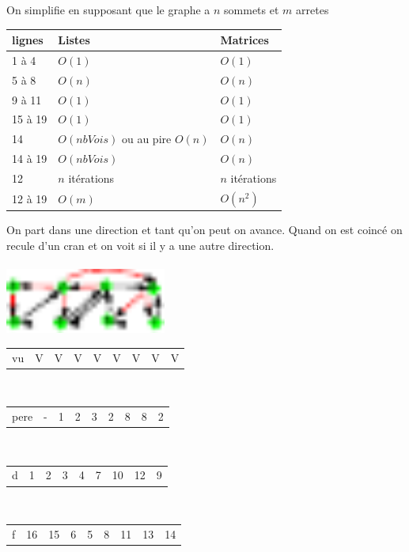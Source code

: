  On simplifie en supposant que le graphe a $n$ sommets et $m$ arretes\\
\begin{tabular}{l|p{4cm}|p{4cm}}
lignes & Listes & Matrices \\ \hline
1 à 4 & $O(1)$ & $O(1)$ \\ \hline
5 à 8 & $O(n)$ & $O(n)$ \\ \hline
9 à 11 & $O(1)$ & $O(1)$ \\ \hline
15 à 19 & $O(1)$ & $O(1)$ \\ \hline
14 & $O(nbVois)$ ou au pire $O(n)$ & $O(n)$ \\ \hline
14 à 19 & $O(nbVois)$ & $O(n)$ \\ \hline
12 & $n$ itérations & $n$ itérations \\ \hline
12 à 19 & $O(m)$ & $O(n^2)$ \\ \hline
\end{tabular}

\newpage

 On part dans une direction et tant qu'on peut on avance. Quand on est coincé on recule d'un cran et on voit si il y a une autre direction. \\

 \\
\includegraphics[width=200px]{Images/fig11.pdf} \\

\begin{tabular}{l|l|l|l|l|l|l|l|l}
 vu & V & V & V & V & V & V & V & V
\end{tabular} \\

\begin{tabular}{l|l|l|l|l|l|l|l|l}
 pere & - & 1 & 2 & 3 & 2 & 8 & 8 & 2
\end{tabular} \\

\begin{tabular}{l|l|l|l|l|l|l|l|l}
 d & 1 & 2 & 3 & 4 & 7 & 10 & 12 & 9
\end{tabular} \\

\begin{tabular}{l|l|l|l|l|l|l|l|l}
 f & 16 & 15 & 6 & 5 & 8 & 11 & 13 & 14
\end{tabular} \\

